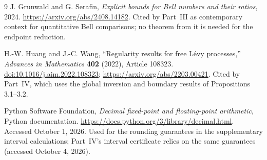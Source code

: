 \documentclass[11pt]{article}
\numberwithin{equation}{section}
\theoremstyle{definition}
\theoremstyle{remark}
\begin{document}
\begin{thebibliography}{9}
J. Grunwald and G. Serafin,
\emph{Explicit bounds for Bell numbers and their ratios}, 2024.
\url{https://arxiv.org/abs/2408.14182}.
Cited by Part~III as contemporary context for quantitative Bell
comparisons; no theorem from it is needed for the endpoint reduction.

H.-W. Huang and J.-C. Wang,
``Regularity results for free L\'evy processes,''
\emph{Advances in Mathematics} \textbf{402} (2022), Article 108323.
\href{https://doi.org/10.1016/j.aim.2022.108323}{doi:10.1016/j.aim.2022.108323};
\url{https://arxiv.org/abs/2203.00421}.
Cited by Part~IV, which uses the global inversion and boundary results of
Propositions 3.1--3.2.

Python Software Foundation,
\emph{Decimal fixed-point and floating-point arithmetic}, Python documentation.
\url{https://docs.python.org/3/library/decimal.html}.
Accessed October 1, 2026. Used for the rounding guarantees in the
supplementary interval calculations; Part~IV's interval certificate
relies on the same guarantees (accessed October 4, 2026).
\end{thebibliography}
\end{document}
